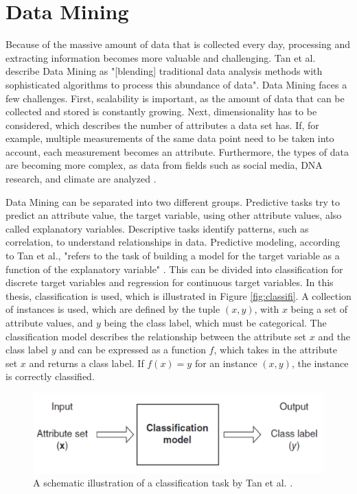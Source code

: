 \section{Data Mining}
Because of the massive amount of data that is collected every day, processing and extracting information becomes more valuable and challenging. Tan et al. describe Data Mining as "[blending] traditional data analysis methods with sophisticated algorithms to process this abundance of data"\cite[p.~21]{DBLP:books/aw/TanSKK2019}. Data Mining faces a few challenges. First, scalability is important, as the amount of data that can be collected and stored is constantly growing. Next, dimensionality has to be considered, which describes the number of attributes a data set has. If, for example, multiple measurements of the same data point need to be taken into account, each measurement becomes an attribute. Furthermore, the types of data are becoming more complex, as data from fields such as social media, DNA research, and climate are analyzed \cite{DBLP:books/aw/TanSKK2019}.

Data Mining can be separated into two different groups. Predictive tasks try to predict an attribute value, the target variable, using other attribute values, also called explanatory variables. Descriptive tasks identify patterns, such as correlation, to understand relationships in data. Predictive modeling, according to Tan et al., "refers to the task of building a model for the target variable as a function of the explanatory variable" \cite[p.~29]{DBLP:books/aw/TanSKK2019}. This can be divided into classification for discrete target variables and regression for continuous target variables. In this thesis, classification is used, which is illustrated in Figure \ref{fig:classifi}. A collection of instances is used, which are defined by the tuple $(x,y)$, with $x$ being a set of attribute values, and $y$ being the class label, which must be categorical. The classification model describes the relationship between the attribute set $x$ and the class label $y$ and can be expressed as a function $f$, which takes in the attribute set $x$ and returns a class label. If $f(x) = y$ for an instance $(x,y)$, the instance is correctly classified.
\begin{figure}
    \centering
    \includegraphics[scale = 0.6]{Images/classification.png}
    \caption{A schematic illustration of a classification task by Tan et al. \cite[p.~134]{DBLP:books/aw/TanSKK2019}.}
    \label{fig:classifiation}
\end{figure}


